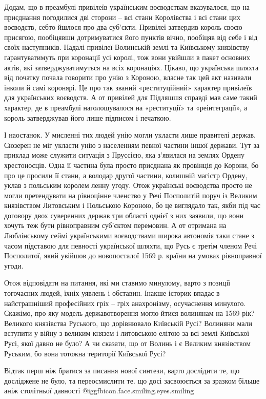 Додам, що в преамбулі привілеїв українським воєводствам вказувалося, що на
приєднання погодилися дві сторони – всі стани Королівства і всі стани цих
воєводств, себто йшлося про два суб’єкти. Привілеї затвердив король своєю
присягою, пообіцявши дотримуватися його пунктів вічно, пообіцяв від себе і від
своїх наступників. Надалі привілеї Волинській землі та Київському князівству
гарантуватимуть при коронації усі королі, тож вони увійшли в пакет основних
актів, які затверджуватимуться на всіх коронаціях. Цікаво, що українська шляхта
від початку почала говорити про унію з Короною, власне так цей акт називали
інколи й самі коронярі. Це про так званий «реституційний» характер привілеїв
для українських воєводств. А от привілей для Підляшшя справді мав саме такий
характер, де в преамбулі наголошувалося на «реституції» та «реінтеграції», а
король затверджував його лише підписом і печаткою. 

І наостанок. У мисленні тих людей унію могли укласти лише правителі держав.
Сюзерен не міг укласти унію з населенням певної частини іншої держави. Тут за
приклад може служити ситуація з Пруссією, яка з’явилася на землях Ордену
хрестоносців. Одна її частина була просто приєднана як провінція до Корони, бо
про це просили її стани, а володар другої частини, колишній магістр Ордену,
уклав з польським  королем ленну угоду.  Отож українські воєводства просто не
могли претендувати на рівноцінне членство у Речі Посполитій поруч із Великим
князівством Литовським і Польською Короною, бо це виглядало так, якби під час
договору двох суверенних держав три області однієї з них заявили, що вони
хочуть теж бути рівноправним суб’єктом перемовин. А от отримана на Люблінському
сеймі українськими воєводствами широка автономія таки стане з часом підставою
для певності української шляхти, що Русь є третім членом Речі Посполитої, який
увійшов до новопосталої 1569 р. країни на умовах рівноправної угоди. 

Отож відповідати на питання, які ми ставимо минулому, варто з позиції
тогочасних людей, їхніх уявлень і обставин. Інакше історик впадає в
найстрашніший професійних гріх – гріх анахронізму, осучаснення минулого.
Скажімо, про яку модель державотворення могло йтися волинянам на 1569 рік?
Великого князівства Руського, що дорівнювало Київській Русі? Волиняни мали
вступити у війну з великим князем і литовською елітою за всі землі Київської
Русі, якої давно не було? А чи сказати, що от Волинь і є Великим князівством
Руським, бо вона тотожна території Київської Русі? 

Відтак перш ніж братися за писання нової синтези, варто дослідити те, що
досліджене не було, та переосмислити те. що досі засвоюється за зразком більше
аніж столітньої давності  @igg{fbicon.face.smiling.eyes.smiling} 
